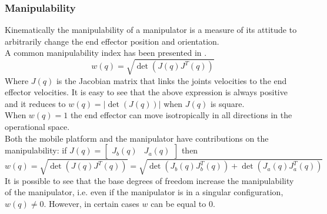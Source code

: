 \subsubsection{Manipulability} 
Kinematically the manipulability of a manipulator is a measure of its attitude to arbitrarily change the end effector position and orientation. \\
A common manipulability index has been presented in \cite{yoshikawa1983} \cite{yoshikawa1985}.
\begin{equation}
w(q) = \sqrt{\det\left(J(q)J^T(q)\right)}
\end{equation}
Where $J(q)$ is the Jacobian matrix that links the joints velocities to the end effector velocities. It is easy to see that the above expression is always positive and it reduces to $w(q)=\left| \det\left(J(q)\right)\right| $ when $J(q)$ is square. \\
When $w(q)=1$ the end effector can move isotropically in all directions in the operational space.\\
Both the mobile platform and the manipulator have contributions on the manipulability: if $J(q)=\left[\begin{matrix}J_b(q)&J_a(q)\end{matrix}\right]$ then
\begin{equation}
w(q) = \sqrt{\det\left(J(q)J^T(q)\right)}=\sqrt{\det\left(J_b(q)J_b^T(q)\right)+\det\left(J_a(q)J_a^T(q)\right)}
\end{equation}
It is possible to see that the base degrees of freedom increase the manipulability of the manipulator, i.e. even if the manipulator is in a singular configuration, $w(q)\neq0$. However, in certain cases $w$ can be equal to 0.
